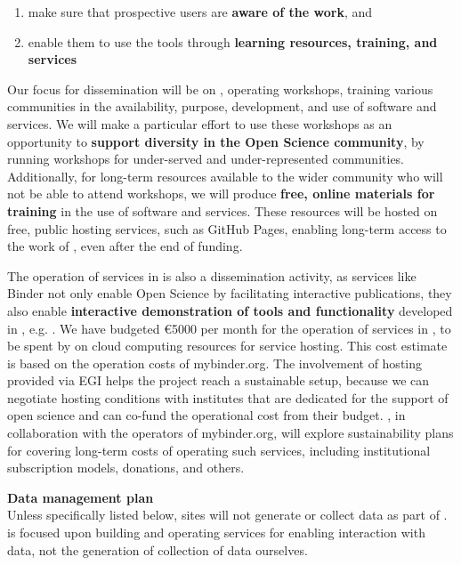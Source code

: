 \begin{enumerate}
  \item make sure that prospective users are \textbf{aware of the work}, and
  \item enable them to use the tools through \textbf{learning resources, training, and services}
\end{enumerate}

Our focus for dissemination will be on ,
operating workshops, training various communities in the availability,
purpose, development, and use of \TheProject software and services.
We will make a particular effort to use these workshops as an opportunity
to \textbf{support diversity in the Open Science community},
by running workshops for under-served and under-represented communities.
Additionally, for long-term resources available to the wider community
who will not be able to attend workshops,
we will produce \textbf{free, online materials for training} in the use of \TheProject
software and services.
These resources will be hosted on free, public hosting services,
such as GitHub Pages,
enabling long-term access to the work of \TheProject,
even after the end of funding.

The operation of services in  is also a dissemination activity,
as services like Binder not only enable Open Science by facilitating interactive publications,
they also enable \textbf{interactive demonstration of tools and functionality}
developed in \TheProject, e.g. .
We have budgeted \euro 5000 per month for the operation of services in ,
to be spent by  on cloud computing resources for service hosting.
This cost estimate is based on the operation costs of mybinder.org.
The involvement of hosting provided via EGI helps the project reach a sustainable setup, because we can negotiate hosting conditions with institutes that are dedicated for the support of open science and can co-fund the operational cost from their budget.
\TheProject, in collaboration with the operators of mybinder.org,
will explore sustainability plans for covering long-term costs of operating such services,
including institutional subscription models, donations, and others.

\medskip
\noindent \textbf{Data management plan} \\
\label{sec:data-management-plan}
Unless specifically listed below,
sites will not generate or collect data as part of \TheProject.
\TheProject is focused upon building and operating services
for enabling interaction with data,
not the generation of collection of data ourselves.

